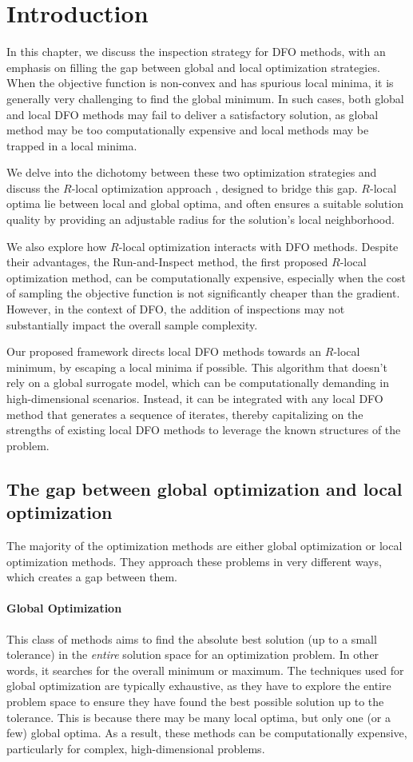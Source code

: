 \section{Introduction}
In this chapter, we discuss the inspection strategy for DFO methods, with an emphasis on filling the gap between global and local optimization strategies.
When the objective function is non-convex and has spurious local minima, it is generally very challenging to find the global minimum.
In such cases, both global and local DFO methods may fail to deliver a satisfactory solution, as global method may be too computationally expensive and local methods may be trapped in a local minima.

We delve into the dichotomy between these two optimization strategies and discuss the $R$-local optimization approach \cite{chen2019run}, designed to bridge this gap. $R$-local optima lie between local and global optima, and often ensures a suitable solution quality by providing an adjustable radius for the solution's local neighborhood.

We also explore how $R$-local optimization interacts with DFO methods. Despite their advantages, the Run-and-Inspect method, the first proposed $R$-local optimization method, can be computationally expensive, especially when the cost of sampling the objective function is not significantly cheaper than the gradient. However, in the context of DFO, the addition of inspections may not substantially impact the overall sample complexity.

Our proposed framework directs local DFO methods towards an $R$-local minimum, by escaping a local minima if possible. This algorithm that doesn't rely on a global surrogate model, which can be computationally demanding in high-dimensional scenarios. Instead, it can be integrated with any local DFO method that generates a sequence of iterates, thereby capitalizing on the strengths of existing local DFO methods to leverage the known structures of the problem.


\subsection{The gap between global optimization and local optimization}
The majority of the optimization methods are either global optimization or local optimization methods. They approach these problems in very different ways, which creates a gap between them. 

\paragraph{Global Optimization} This class of methods aims to find the absolute best solution (up to a small tolerance) in the \emph{entire} solution space for an optimization problem. In other words, it searches for the overall minimum or maximum. The techniques used for global optimization are typically exhaustive, as they have to explore the entire problem space to ensure they have found the best possible solution up to the tolerance. This is because there may be many local optima, but only one (or a few) global optima. As a result, these methods can be computationally expensive, particularly for complex, high-dimensional problems.

